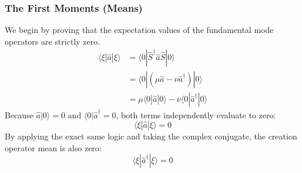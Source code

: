 \subsubsection{The First Moments (Means)}
We begin by proving that the expectation values of the fundamental mode operators are strictly zero.
\begin{align*}
\langle \xi | \hat{a} | \xi \rangle &= \langle 0 | \hat{S}^\dagger \hat{a} \hat{S} | 0 \rangle \\
&= \langle 0 | (\mu\hat{a} - \nu\hat{a}^\dagger) | 0 \rangle \\
&= \mu \langle 0 | \hat{a} | 0 \rangle - \nu \langle 0 | \hat{a}^\dagger | 0 \rangle
\end{align*}
Because $\hat{a}|0\rangle = 0$ and $\langle 0|\hat{a}^\dagger = 0$, both terms independently evaluate to zero:
\begin{equation*}
\langle \xi | \hat{a} | \xi \rangle = 0
\end{equation*}
By applying the exact same logic and taking the complex conjugate, the creation operator mean is also zero:
\begin{equation*}
\langle \xi | \hat{a}^\dagger | \xi \rangle = 0
\end{equation*}

